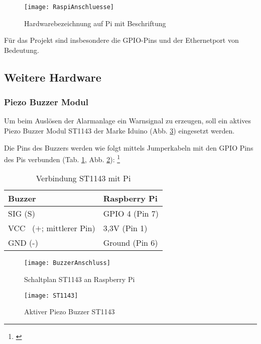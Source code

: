 \documentclass[a4paper,12pt]{article}
\begin{document}
	\begin{figure}[H]
		\centering
		\texttt{[image: RaspiAnschluesse]}
		\caption{Hardwarebezeichnung auf Pi mit Beschriftung \cite{.06.03.2019}}
		\label{RaspiAnschluesse}
	\end{figure}
	
Für das Projekt sind insbesondere die GPIO-Pins und der Ethernetport von Bedeutung.\par

\newpage

\subsection{Weitere Hardware}
\subsubsection{Piezo Buzzer Modul}
	Um beim Auslösen der Alarmanlage ein Warnsignal zu erzeugen, soll ein aktives Piezo Buzzer Modul ST1143 der Marke Iduino (Abb. \ref{ST1143}) eingesetzt werden.\par Die Pins des Buzzers werden wie folgt mittels Jumperkabeln mit den GPIO Pins des Pis verbunden (Tab. \ref{BuzzerTabelle}, Abb. \ref{BuzzerAnschluss}): \footnote{\cite{Draeger.2019}}
	
	\begin{table}[H]
		\centering
		\begin{tabular}{|p{5cm}|p{5cm}|} 
			\hline
			Buzzer & Raspberry Pi\\ 
			\hline
			SIG (S)   & GPIO 4 \hspace{0,1cm}(Pin 7)\\  
			\hline
			VCC~ ($+$; mittlerer Pin)   & 3,3V 	\hspace{0,7cm}(Pin 1)\\
			\hline
			GND (-)    & Ground  	\hspace{0,2cm}(Pin 6)\\
			\hline
		\end{tabular}
	\caption{Verbindung ST1143 mit Pi}
	\label{BuzzerTabelle}
	\end{table} 

	\begin{figure}[H]
	\centering
	\texttt{[image: BuzzerAnschluss]}
	\caption{Schaltplan ST1143 an Raspberry Pi}
	\label{BuzzerAnschluss}
	\end{figure}

	\begin{figure}[H]	%
	\centering
	\texttt{[image: ST1143]}
	\caption{Aktiver Piezo Buzzer ST1143 \cite{reicheltelektronikGmbH&amp.21.04.2022}}
	\label{ST1143}
	\end{figure}
\end{document}

